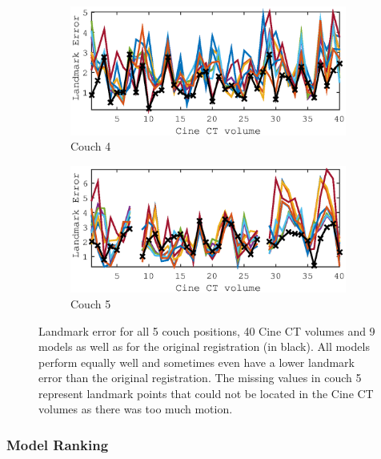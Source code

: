 \documentclass[11pt,a4paper,oneside]{report}
\begin{document}
\begin{figure}
  \begin{subfigure}[b]{0.5\textwidth}
    \includegraphics[width=\textwidth, trim=0 0 0 0,clip=true]{figures/task4/landmark_error_couch4.eps}
    \caption{Couch 4}
  \end{subfigure}%
  \begin{subfigure}[b]{0.5\textwidth}
    \includegraphics[width=\textwidth, trim=0 0 0 0,clip=true]{figures/task4/landmark_error_couch5.eps}
    \caption{Couch 5}
  \end{subfigure}%
  
  \caption{Landmark error for all 5 couch positions, 40 Cine CT volumes and 9 models as well as for the original registration (in black). All models perform equally well and sometimes even have a lower landmark error than the original registration. The missing values in couch 5 represent landmark points that could not be located in the Cine CT volumes as there was too much motion.}
  \label{fig:c4landError}
  
\end{figure}

\subsubsection*{Model Ranking}
\end{document}
